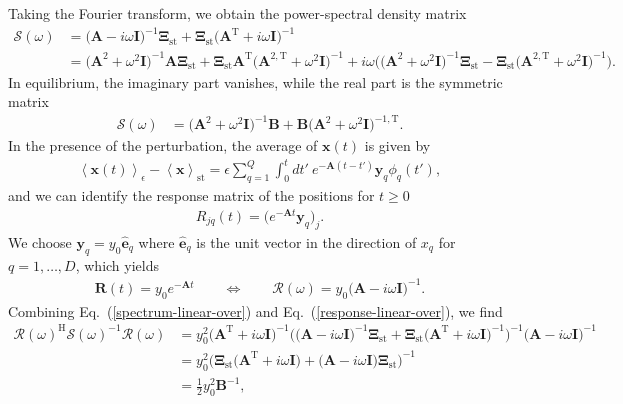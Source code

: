 \documentclass[aps,pre,twocolumn,superscriptaddress,notitlepage]{revtex4-2}
\newcommand{\Av}[1]{\left\langle #1 \right\rangle}
\newcommand{\nn}{\nonumber \\}
\newcommand{\n}{\nonumber}
\newcommand{\bmc}[1]{\bm{\mathcal{#1}}}
\renewcommand{\eqref}[1]{Eq.~(\ref{#1})}
\begin{document}
Taking the Fourier transform, we obtain the power-spectral density matrix
\begin{align}
\bmc{S}(\omega) &= \big( \bm{A} - i \omega \bm{I}\big)^{-1} \bm{\Xi}_\text{st} + \bm{\Xi}_\text{st} \big( \bm{A}^\text{T} + i \omega \bm{I}\big)^{-1} \label{spectrum-linear-over} \\
&= \big( \bm{A}^2 + \omega^2 \bm{I}\big)^{-1} \bm{A} \bm{\Xi}_\text{st} + \bm{\Xi}_\text{st} \bm{A}^\text{T} \big( \bm{A}^{2,\text{T}} + \omega^2 \bm{I}\big)^{-1} + i \omega \Big( \big( \bm{A}^2 + \omega^2 \bm{I}\big)^{-1} \bm{\Xi}_\text{st} - \bm{\Xi}_\text{st} \big( \bm{A}^{2,\text{T}} + \omega^2 \bm{I}\big)^{-1} \Big) . \n
\end{align}
In equilibrium, the imaginary part vanishes, while the real part is the symmetric matrix
\begin{align}
\bmc{S}(\omega) &= \big( \bm{A}^2 + \omega^2 \bm{I}\big)^{-1} \bm{B} + \bm{B} \big( \bm{A}^{2} + \omega^2 \bm{I}\big)^{-1,\text{T}} .
\end{align}
In the presence of the perturbation, the average of $\bm{x}(t)$ is given by
\begin{align}
\Av{\bm{x}(t)}_\epsilon - \Av{\bm{x}}_\text{st} = \epsilon \sum_{q=1}^Q \int_0^t dt' \ e^{-\bm{A}(t-t')} \bm{y}_q \phi_q(t'),
\end{align}
and we can identify the response matrix of the positions for $t \geq 0$
\begin{align}
R_{jq}(t) = \big(e^{-\bm{A} t} \bm{y}_q \big)_j .
\end{align}
We choose $\bm{y}_q = y_0 \hat{\bm{e}}_q$ where $\hat{\bm{e}}_q$ is the unit vector in the direction of $x_q$ for $q = 1,\ldots,D$, which yields
\begin{align}
\bm{R}(t) = y_0 e^{-\bm{A} t} \qquad \Leftrightarrow \qquad \bmc{R}(\omega) = y_0 \big(\bm{A} - i \omega \bm{I} \big)^{-1} \label{response-linear-over} .
\end{align}
Combining \eqref{spectrum-linear-over} and \eqref{response-linear-over}, we find
\begin{align}
\bmc{R}(\omega)^\text{H} \bmc{S}(\omega)^{-1} \bmc{R}(\omega) &= y_0^2 \big(\bm{A}^\text{T} + i \omega \bm{I} \big)^{-1} \Big( \big( \bm{A} - i \omega \bm{I}\big)^{-1} \bm{\Xi}_\text{st} + \bm{\Xi}_\text{st} \big( \bm{A}^\text{T} + i \omega \bm{I}\big)^{-1} \Big)^{-1} \big(\bm{A} - i \omega \bm{I} \big)^{-1} \\
&= y_0^2 \Big( \bm{\Xi}_\text{st} \big( \bm{A}^\text{T} + i \omega \bm{I}\big) + \big( \bm{A} - i \omega \bm{I}\big) \bm{\Xi}_\text{st} \Big)^{-1} \nn
&= \frac{1}{2} y_0^2 \bm{B}^{-1} \n ,
\end{align}
\end{document}
